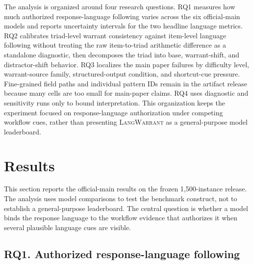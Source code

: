 \documentclass[10pt,conference]{IEEEtran}
\newcommand{\dataset}{\textsc{LangWarrant}}
\begin{document}
The analysis is organized around four research questions. RQ1 measures how much authorized response-language following varies across the six official-main models and reports uncertainty intervals for the two headline language metrics. RQ2 calibrates triad-level warrant consistency against item-level language following without treating the raw item-to-triad arithmetic difference as a standalone diagnostic, then decomposes the triad into base, warrant-shift, and distractor-shift behavior. RQ3 localizes the main paper failures by difficulty level, warrant-source family, structured-output condition, and shortcut-cue pressure. Fine-grained field paths and individual pattern IDs remain in the artifact release because many cells are too small for main-paper claims. RQ4 uses diagnostic and sensitivity runs only to bound interpretation. This organization keeps the experiment focused on response-language authorization under competing workflow cues, rather than presenting \dataset{} as a general-purpose model leaderboard.


\section{Results}
\suppressfloats[t]

This section reports the official-main results on the frozen 1,500-instance release. The analysis uses model comparisons to test the benchmark construct, not to establish a general-purpose leaderboard. The central question is whether a model binds the response language to the workflow evidence that authorizes it when several plausible language cues are visible.

\subsection{RQ1. Authorized response-language following}
\end{document}
